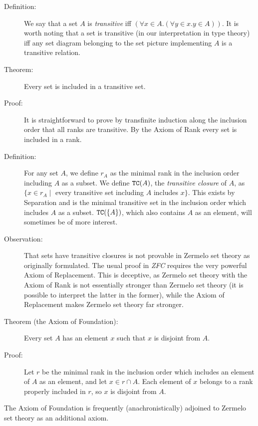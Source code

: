 \documentclass[12pt]{book}
\begin{document}
\begin{description}

\item[Definition:] We say that a set $A$ is {\em transitive\/} iff
$(\forall x \in A.(\forall y \in x.y \in A))$.  It is worth noting
that a set is transitive (in our interpretation in type theory) iff
any set diagram belonging to the set picture implementing $A$ is a
transitive relation.

\item[Theorem:]  Every set is included in a transitive set.

\item[Proof:] It is straightforward to prove by transfinite induction
along the inclusion order that all ranks are transitive.  By the Axiom
of Rank every set is included in a rank.

\item[Definition:] For any set $A$, we define $r_A$ as the minimal
rank in the inclusion order including $A$ as a subset.  We define
${\tt TC}(A)$, the {\em transitive closure\/} of $A$, as $\{x \in r_A
\mid$ every transitive set including $A$ includes $x\}$.  This exists
by Separation and is the minimal transitive set in the inclusion order
which includes $A$ as a subset.  ${\tt TC}(\{A\})$, which also
contains $A$ as an element, will sometimes be of more interest.

\item[Observation:] That sets have transitive closures is not provable
in Zermelo set theory as originally formulated.  The usual proof in
{\em ZFC\/} requires the very powerful Axiom of Replacement.  This is
deceptive, as Zermelo set theory with the Axiom of Rank is not
essentially stronger than Zermelo set theory (it is possible to
interpret the latter in the former), while the Axiom of Replacement
makes Zermelo set theory far stronger.

\item[Theorem (the Axiom of Foundation):] Every set $A$ has an element
$x$ such that $x$ is disjoint from $A$.

\item[Proof:] Let $r$ be the minimal rank in the inclusion order which
includes an element of $A$ as an element, and let $x \in r \cap A$.
Each element of $x$ belongs to a rank properly included in $r$, so $x$
is disjoint from $A$.

\end{description}

The Axiom of Foundation is frequently (anachronistically) adjoined to
Zermelo set theory as an additional axiom.
\end{document}
